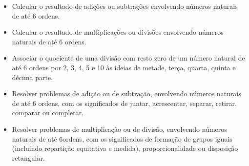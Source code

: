 \begin{itemize}
\item Calcular o resultado de adições ou subtrações envolvendo números
naturais de até 6 ordens.

\item Calcular o resultado de multiplicações ou divisões envolvendo números
naturais de até 6 ordens.

\item Associar o quociente de uma divisão com resto zero de um número
natural de até 6 ordens por 2, 3, 4, 5 e 10 às ideias de metade, terça,
quarta, quinta e décima parte.

\item Resolver problemas de adição ou de subtração, envolvendo números
naturais de até 6 ordens, com os significados de juntar, acrescentar,
separar, retirar, comparar ou completar.

\item Resolver problemas de multiplicação ou de divisão, envolvendo números
naturais de até 6ordens, com os significados de formação de grupos
iguais (incluindo repartição equitativa e medida), proporcionalidade ou
disposição retangular.
\end{itemize}


